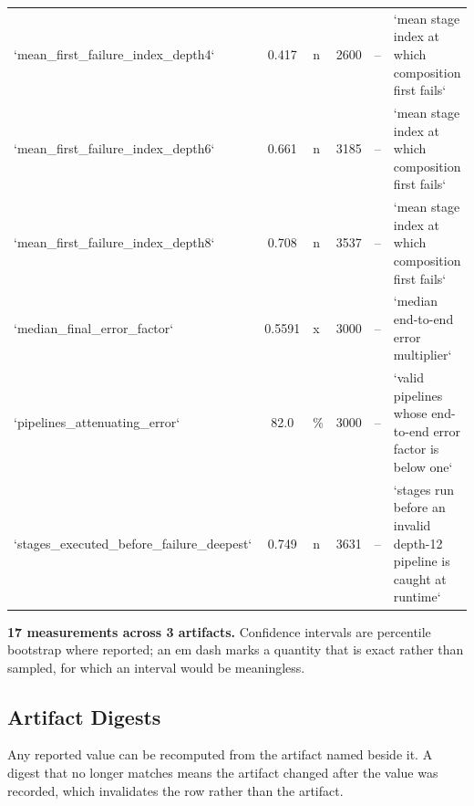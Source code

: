 \documentclass[10pt,twocolumn,letterpaper]{article}
\begin{document}
\begin{table}[htbp]
{\begin{tabular}{lclcll}
`mean\_first\_failure\_index\_depth4` & 0.417 & n & 2600 & -- & `mean stage index at which composition first fails` \\
`mean\_first\_failure\_index\_depth6` & 0.661 & n & 3185 & -- & `mean stage index at which composition first fails` \\
`mean\_first\_failure\_index\_depth8` & 0.708 & n & 3537 & -- & `mean stage index at which composition first fails` \\
`median\_final\_error\_factor` & 0.5591 & x & 3000 & -- & `median end-to-end error multiplier` \\
`pipelines\_attenuating\_error` & 82.0 & \% & 3000 & -- & `valid pipelines whose end-to-end error factor is below one` \\
`stages\_executed\_before\_failure\_deepest` & 0.749 & n & 3631 & -- & `stages run before an invalid depth-12 pipeline is caught at runtime` \\
\bottomrule
\end{tabular}}
\end{table}

\textbf{17 measurements across 3 artifacts.} Confidence intervals are percentile bootstrap where reported; an em dash marks a quantity that is exact rather than sampled, for which an interval would be meaningless.


\subsection{Artifact Digests}
\begin{table}[htbp]
\centering
{}
\end{table}

Any reported value can be recomputed from the artifact named beside it. A digest that no longer matches means the artifact changed after the value was recorded, which invalidates the row rather than the artifact.




{\small
\par\vspace{0.5em}


}
\end{document}

